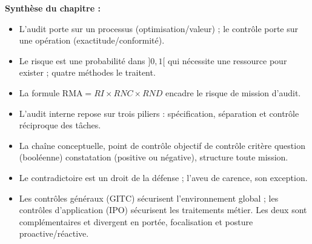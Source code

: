 \begin{boxresume}
\textbf{Synthèse du chapitre :}
\begin{itemize}
  \item L'audit porte sur un processus (optimisation/valeur) ; le contrôle porte sur
    une opération (exactitude/conformité).
  \item Le risque est une probabilité dans $]0,1[$ qui nécessite une ressource pour
    exister ; quatre méthodes le traitent.
  \item La formule $\mathrm{RMA} = RI \times RNC \times RND$ encadre le risque de
    mission d'audit.
  \item L'audit interne repose sur trois piliers : spécification, séparation et contrôle
    réciproque des tâches.
  \item La chaîne conceptuelle, point de contrôle \textrightarrow{} objectif de
    contrôle \textrightarrow{} critère \textrightarrow{} question (booléenne)
    \textrightarrow{} constatation (positive ou négative), structure toute mission.
  \item Le contradictoire est un droit de la défense ; l'aveu de carence, son exception.
  \item Les contrôles généraux (GITC) sécurisent l'environnement global ; les contrôles
    d'application (IPO) sécurisent les traitements métier. Les deux sont complémentaires
    et divergent en portée, focalisation et posture proactive/réactive.
\end{itemize}
\end{boxresume}
